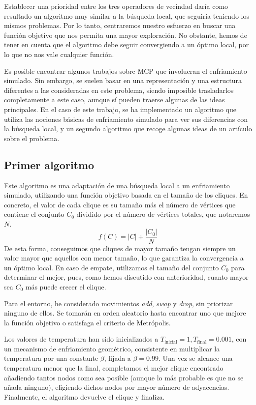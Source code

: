 Establecer una prioridad entre los tres operadores de vecindad daría como resultado un
algoritmo muy similar a la búsqueda local, que seguiría teniendo los mismos problemas.
Por lo tanto, centraremos nuestro esfuerzo en buscar una función objetivo que nos
permita una mayor exploración. No obstante, hemos de tener en cuenta que el algoritmo
debe seguir convergiendo a un óptimo local, por lo que no nos vale cualquier función.

Es posible encontrar algunos trabajos sobre MCP que involucran el enfriamiento simulado.
Sin embargo, se suelen basar en una representación y una estructura diferentes a las
consideradas en este problema, siendo imposible trasladarlos completamente a este caso,
aunque sí pueden traerse algunas de las ideas principales. En el caso de este trabajo,
se ha implementado un algoritmo que utiliza las nociones básicas de enfriamiento simulado
para ver sus diferencias con la búsqueda local, y un segundo algoritmo que recoge algunas
ideas de un artículo sobre el problema.

\subsection{Primer algoritmo}\label{enfriamiento1}

Este algoritmo es una adaptación de una búsqueda local a un enfriamiento simulado, utilizando
una función objetivo basada en el tamaño de los cliques. En concreto, el valor de cada clique
es su tamaño más el número de vértices que contiene el conjunto $C_0$ dividido por el número
de vértices totales, que notaremos $N$.
\[ f(C) = |C| + \frac{|C_0|}{N} \]
De esta forma, conseguimos que cliques de mayor tamaño tengan siempre un valor mayor que
aquellos con menor tamaño, lo que garantiza la convergencia a un óptimo local. En caso
de empate, utilizamos el tamaño del conjunto $C_0$ para determinar el mejor, pues, como
hemos discutido con anterioridad, cuanto mayor sea $C_0$ más puede crecer el clique.

Para el entorno, he considerado movimientos \textit{add}, \textit{swap} y \textit{drop},
sin priorizar ninguno de ellos. Se tomarán en orden aleatorio hasta encontrar uno que
mejore la función objetivo o satisfaga el criterio de Metrópolis.

Los valores de temperatura han sido inicializados a $T_{\text{inicial}} = 1,
T_{\text{final}} = 0.001$, con un mecanismo de enfriamiento geométrico, consistente
en multiplicar la temperatura por una constante $\beta$, fijada a $\beta = 0.99$.
Una vez se alcance una temperatura menor que la final, completamos el mejor clique
encontrado añadiendo tantos nodos como sea posible (aunque lo más probable es que
no se añada ninguno), eligiendo dichos nodos por mayor número de adyacencias.
Finalmente, el algoritmo devuelve el clique y finaliza.

